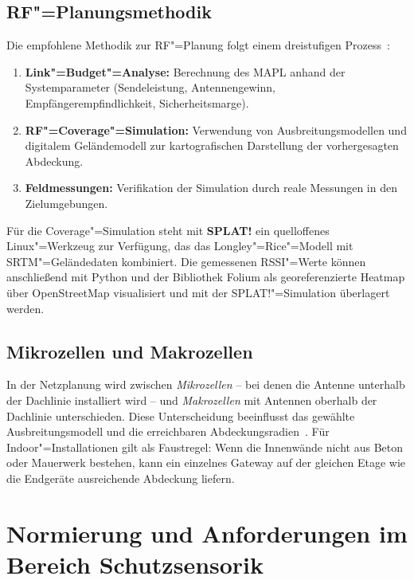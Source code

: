 \subsection{RF"=Planungsmethodik}
\label{subsec:rf-methodik}

Die empfohlene Methodik zur RF"=Planung folgt einem dreistufigen Prozess~\cite{haslett2008essentials}:

\begin{enumerate}
  \item \textbf{Link"=Budget"=Analyse:} Berechnung des MAPL anhand der Systemparameter
        (Sendeleistung, Antennengewinn, Empfängerempfindlichkeit, Sicherheitsmarge).
  \item \textbf{RF"=Coverage"=Simulation:} Verwendung von Ausbreitungsmodellen und
        digitalem Geländemodell zur kartografischen Darstellung der vorhergesagten Abdeckung.
  \item \textbf{Feldmessungen:} Verifikation der Simulation durch reale Messungen in den
        Zielumgebungen.
\end{enumerate}

Für die Coverage"=Simulation steht mit \textbf{SPLAT!} ein quelloffenes Linux"=Werkzeug
zur Verfügung, das das Longley"=Rice"=Modell mit \ac{SRTM}"=Geländedaten kombiniert.
Die gemessenen RSSI"=Werte können anschließend mit Python und der Bibliothek Folium
als georeferenzierte Heatmap über OpenStreetMap visualisiert und mit der
SPLAT!"=Simulation überlagert werden.

\subsection{Mikrozellen und Makrozellen}
\label{subsec:zellen}

In der Netzplanung wird zwischen \textit{Mikrozellen} -- bei denen die Antenne
unterhalb der Dachlinie installiert wird -- und \textit{Makrozellen} mit Antennen
oberhalb der Dachlinie unterschieden. Diese Unterscheidung beeinflusst das
gewählte Ausbreitungsmodell und die erreichbaren Abdeckungsradien~\cite{walter2006radio}.
Für Indoor"=Installationen gilt als Faustregel: Wenn die Innenwände nicht aus Beton oder
Mauerwerk bestehen, kann ein einzelnes Gateway auf der gleichen Etage wie die
Endgeräte ausreichende Abdeckung liefern.


\section{Normierung und Anforderungen im Bereich Schutzsensorik}
\label{sec:normierung}


